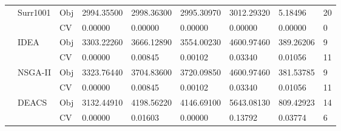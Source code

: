 \begin{table*}[!htb]
\begin{tabular}{lllllllll}
		& Surr1001                           & Obj                                & 2994.35500                         & 2998.36300                         & 2995.30970                           & 3012.29320                          & 5.18496                           & 20               \\
		&                                    & CV                                 & 0.00000                            & 0.00000                            & 0.00000                              & 0.00000                             & 0.00000                           & 0                \\
		& IDEA                               & Obj                                & 3303.22260                         & 3666.12890                         & 3554.00230                           & 4600.97460                          & 389.26206                         & 9                \\
		&                                    & CV                                 & 0.00000                            & 0.00845                            & 0.00102                              & 0.03340                             & 0.01056                           & 11               \\
		& NSGA-II                            & Obj                                & 3323.76440                         & 3704.83600                         & 3720.09850                           & 4600.97460                          & 381.53785                         & 9                \\
		&                                    & CV                                 & 0.00000                            & 0.00845                            & 0.00102                              & 0.03340                             & 0.01056                           & 11               \\
		& DEACS                              & Obj                                & 3132.44910                         & 4198.56220                         & 4146.69100                           & 5643.08130                          & 809.42923                         & 14               \\
		&                                    & CV                                 & 0.00000                            & 0.01603                            & 0.00000                              & 0.13792                             & 0.03774                           & 6                \\

\end{tabular}
\end{table*}
